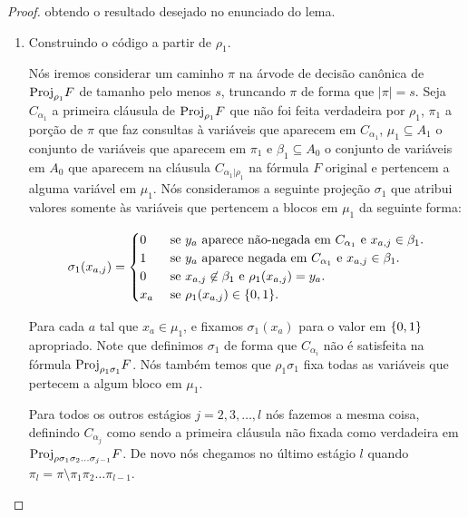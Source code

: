 \begin{proof}
obtendo o resultado desejado no enunciado do lema.

\begin{enumerate}

	\item Construindo o código a partir de $\rho_{1}$.
	
	Nós iremos considerar um caminho $\pi$ na árvode de decisão canônica de $\text{Proj}_{\rho_{1}}F$ de tamanho pelo menos $s$, truncando $\pi$ de forma que $\lvert \pi \rvert = s$. Seja $C_{\alpha_{1}}$ a primeira cláusula de $\text{Proj}_{\rho_{1}}F$ que não foi feita verdadeira por $\rho_{1}$, $\pi_{1}$ a porção de $\pi$ que faz consultas à variáveis que aparecem em $C_{\alpha_{1}}$, $\mu_{1} \subseteq A_{1}$ o conjunto de variáveis que aparecem em $\pi_{1}$ e  $\beta_{1} \subseteq A_{0}$ o conjunto de variáveis em $A_{0}$ que aparecem na cláusula $C_{\alpha_{1} \lvert \rho_{1}}$ na fórmula $F$ original e pertencem a alguma variável em $\mu_{1}$. Nós consideramos a seguinte projeção $\sigma_{1}$ que atribui valores somente às variáveis que pertencem a blocos em $\mu_{1}$ da seguinte forma:
	
	\begin{equation} \label{sigma_i_def}
		\sigma_{1}(x_{a, j}) = \begin{cases}
					      	0 & \text{ se } y_{a} \text{ aparece não-negada em } C_{\alpha_{1}} \text{ e } x_{a, j} \in \beta_{1}. \\
					      	1 & \text{ se } y_{a} \text{ aparece negada em } C_{\alpha_{1}} \text{ e } x_{a, j} \in \beta_{1}. \\
					      	0 & \text{ se } x_{a, j} \not\in \beta_{1} \text{ e } \rho_{1}(x_{a, j}) = y_{a}. \\
					      	x_{a} & \text{ se } \rho_{1}(x_{a, j}) \in \{0, 1\}.
					      \end{cases}
	\end{equation}
	
	Para cada $a$ tal que $x_{a} \in \mu_{1}$, e fixamos $\sigma_{1}(x_{a})$ para o valor em $\{0, 1\}$ apropriado. Note que definimos $\sigma_{1}$ de forma que $C_{\alpha_{i}}$ não é satisfeita na fórmula $\text{Proj}_{\rho_{1}\sigma_{1}}F$. Nós também temos que $\rho_{1}\sigma_{1}$ fixa todas as variáveis que pertecem a algum bloco em $\mu_{1}$.
	
	Para todos os outros estágios $j = 2, 3, \dots, l$ nós fazemos a mesma coisa, definindo $C_{\alpha_{j}}$ como sendo a primeira cláusula não fixada como verdadeira em $\text{Proj}_{\rho\sigma_{1}\sigma_{2}\dots\sigma_{j - 1}}F$. De novo nós chegamos no último estágio $l$ quando $\pi_{l} = \pi \setminus \pi_{1}\pi_{2}\dots\pi_{l - 1}$.
	

\end{enumerate}
\end{proof}
